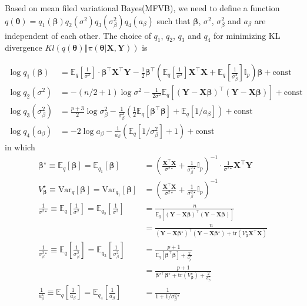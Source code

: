 \documentclass[12pt]{article}
\begin{document}
Based on mean filed variational Bayes(MFVB), we need to define a function $q(\bm{\theta}) = q_1(\bm{\beta})q_2(\sigma^2)q_3(\sigma_{\beta}^2)q_4(a_\beta)$ such that $\bm{\beta}$, $\sigma^2$, $\sigma_{\beta}^2$ and $a_\beta$ are independent of each other. The choice of $q_1$, $q_2$, $q_3$ and $q_4$ for minimizing KL divergence $Kl\left(\left. q(\bm{\theta}) \right\Vert \pi(\left.\bm{\theta}\right\vert \bm{X}, \bm{Y})\right)$ is

\begin{align*}
	\log q_1(\bm{\beta}) &= \mathbb{E}_q\left[\frac{1}{\sigma^2} \right]\cdot \bm{\beta}^\top \bm{X}^\top \bm{Y} - \frac{1}{2}\bm{\beta}^\top \left( \mathbb{E}_q\left[\frac{1}{\sigma^2} \right]\bm{X}^\top \bm{X} + \mathbb{E}_q\left[\frac{1}{\sigma_{\beta}^2} \right]\mathbb{I}_p \right) \bm{\beta} + \text{const}\\
	\log q_2(\sigma^2) &= -(n/2+1)\log \sigma^2 - \frac{1}{2\sigma^2} \mathbb{E}_{q}\left[ (\bm{Y} - \bm{X}\bm{\beta})^\top (\bm{Y} - \bm{X}\bm{\beta}) \right] + \text{const} \\
	\log q_3(\sigma_{\beta}^2) &= \frac{p+3}{2}\log \sigma_{\beta}^2 - \frac{1}{\sigma_{\beta}^2}\left( \frac{1}{2}\mathbb{E}_{q}[\bm{\beta}^\top \bm{\beta}] + \mathbb{E}_q[1/a_\beta] \right) + \text{const} \\
	\log q_4(a_\beta) &= -2\log a_\beta - \frac{1}{a_\beta} \left( \mathbb{E}_{q}[1/\sigma_{\beta}^2]+1 \right) + \text{const}
\end{align*}
in which
\begin{align*}
	\bm{\beta}^\star \equiv \mathbb{E}_{q}[\bm{\beta}] = \mathbb{E}_{q_1}[\bm{\beta}] &= \left(\frac{\bm{X}^\top \bm{X}}{\sigma^{2\star}} + \frac{1}{\sigma_{\beta}^{2\star}} \mathbb{I}_{p} \right)^{-1} \cdot \frac{1}{\sigma^{2 \star }}\bm{X}^\top \bm{Y}\\
	V_{\bm{\beta}}^\star \equiv  \text{Var}_q[\bm{\beta}] = \text{Var}_{q_1}[\bm{\beta}] &= \left(\frac{\bm{X}^\top \bm{X}}{\sigma^{2\star}} + \frac{1}{\sigma_{\beta}^{2\star}} \mathbb{I}_{p} \right)^{-1}\\
	\frac{1}{\sigma^{2\star}}\equiv  \mathbb{E}_{q}\left[\frac{1}{\sigma^2} \right] = \mathbb{E}_{q_2}\left[\frac{1}{\sigma^2} \right] &= \frac{n}{\mathbb{E}_q\left[(\bm{Y} - \bm{X}\bm{\beta})^{\top} (\bm{Y} - \bm{X}\bm{\beta})\right]} \\
	&= \frac{n}{(\bm{Y} - \bm{X}\bm{\beta}^\star)^{\top} (\bm{Y} - \bm{X}\bm{\beta}^\star) + \text{tr}(V_{\bm{\beta}}^{\star} \bm{X}^\top \bm{X})} \\
	\frac{1}{\sigma_{\beta}^{2\star}} \equiv \mathbb{E}_{q}\left[\frac{1}{\sigma_{\beta}^2} \right] = \mathbb{E}_{q_3}\left[\frac{1}{\sigma_{\beta}^2} \right]&=\frac{p+1}{\mathbb{E}_q[\bm{\beta}^\top \bm{\beta}] + \frac{2}{a_\beta^\star}}\\
	&= \frac{p+1}{\bm{\beta}^{\star \top} \bm{\beta}^\star + \text{tr}(V_{\bm{\beta}}^\star) + \frac{2}{a_\beta^\star}}\\
	\frac{1}{a_{\beta}^\star} \equiv \mathbb{E}_q\left[ \frac{1}{a_{\beta}} \right] = \mathbb{E}_{q_4}\left[ \frac{1}{a_{\beta}} \right] &= \frac{1}{1+1/\sigma_{\beta}^{2\star}}
\end{align*}
\end{document}
